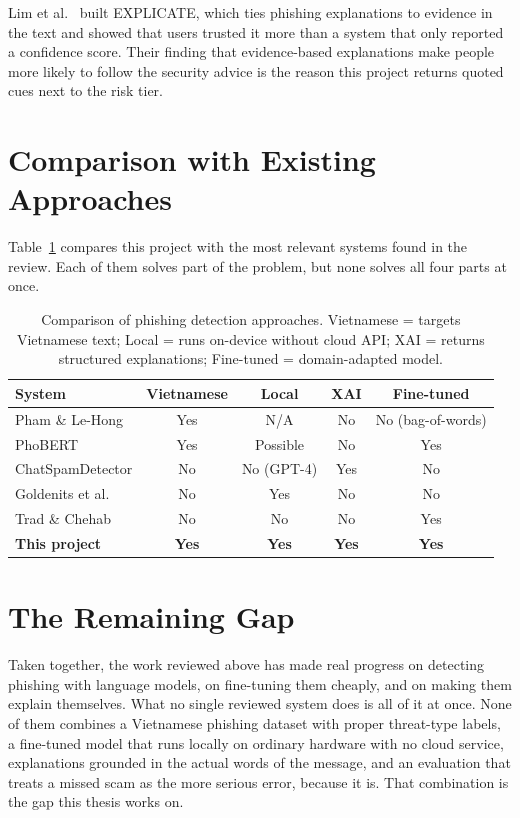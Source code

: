 Lim et al.~\cite{lim2025explicate} built EXPLICATE, which ties phishing explanations to evidence in the text and showed that users trusted it more than a system that only reported a confidence score. Their finding that evidence-based explanations make people more likely to follow the security advice is the reason this project returns quoted cues next to the risk tier.

\section{Comparison with Existing Approaches}

Table~\ref{tab:approach-comparison} compares this project with the most relevant systems found in the review. Each of them solves part of the problem, but none solves all four parts at once.

\begin{table}[H]
\centering
\renewcommand{\arraystretch}{1.2}
\footnotesize
\begin{tabular}{p{3.0cm}cccc}
\toprule
\textbf{System} & \textbf{Vietnamese} & \textbf{Local} & \textbf{XAI} & \textbf{Fine-tuned} \\
\midrule
Pham \& Le-Hong \cite{pham2016vietnamese} & Yes & N/A & No & No (bag-of-words) \\
PhoBERT \cite{nguyen2020phobert} & Yes & Possible & No & Yes \\
ChatSpamDetector \cite{koide2024chatspamdetector} & No & No (GPT-4) & Yes & No \\
Goldenits et al. \cite{goldenits2026small} & No & Yes & No & No \\
Trad \& Chehab \cite{trad2024prompt} & No & No & No & Yes \\
\textbf{This project} & \textbf{Yes} & \textbf{Yes} & \textbf{Yes} & \textbf{Yes} \\
\bottomrule
\end{tabular}
\caption{Comparison of phishing detection approaches. Vietnamese = targets Vietnamese text; Local = runs on-device without cloud API; XAI = returns structured explanations; Fine-tuned = domain-adapted model.}
\label{tab:approach-comparison}
\end{table}

\section{The Remaining Gap}

Taken together, the work reviewed above has made real progress on detecting phishing with language models, on fine-tuning them cheaply, and on making them explain themselves. What no single reviewed system does is all of it at once. None of them combines a Vietnamese phishing dataset with proper threat-type labels, a fine-tuned model that runs locally on ordinary hardware with no cloud service, explanations grounded in the actual words of the message, and an evaluation that treats a missed scam as the more serious error, because it is. That combination is the gap this thesis works on.
